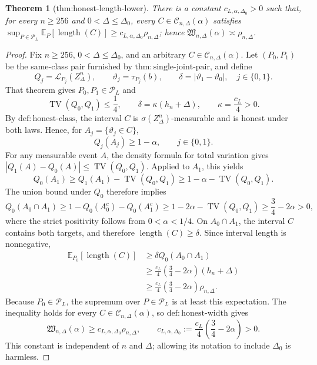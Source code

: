 \documentclass{article}
\newtheorem{theorem}{Theorem}
\begin{document}
\begin{theorem}[thm:honest-length-lower]\label{thm:honest-length-lower}
There is a constant \(c_{L,\alpha,\Delta_0}>0\) such that, for every \(n\geq256\) and \(0<\Delta\leq\Delta_0\), every \(C\in\mathcal C_{n,\Delta}(\alpha)\) satisfies \(\sup_{P\in\mathcal P_L}\mathbb E_P[\operatorname{length}(C)]\geq c_{L,\alpha,\Delta_0}\rho_{n,\Delta}\); hence \(\mathfrak W_{n,\Delta}(\alpha)\asymp\rho_{n,\Delta}\).
\end{theorem}
\begin{proof}
Fix \(n\geq256\), \(0<\Delta\leq\Delta_0\), and an arbitrary \(C\in\mathcal C_{n,\Delta}(\alpha)\).  Let \((P_0,P_1)\) be the same-class pair furnished by \(\mathrm{thm:single\text{-}joint\text{-}pair}\), and define
\[
 Q_j=\mathcal L_{P_j}(Z_\Delta^n),
 \qquad
 \vartheta_j=\tau_{P_j}(b),
 \qquad
 \delta=|\vartheta_1-\vartheta_0|,
 \quad j\in\{0,1\}.
\]
That theorem gives \(P_0,P_1\in\mathcal P_L\) and
\[
 \operatorname{TV}(Q_0,Q_1)\leq\frac14,
 \qquad
 \delta=\kappa(h_n+\Delta),
 \qquad
 \kappa=\frac{c_L}{4}>0.
\]
By \(\mathrm{def:honest\text{-}class}\), the interval \(C\) is \(\sigma(Z_\Delta^n)\)-measurable and is honest under both laws.  Hence, for \(A_j=\{\vartheta_j\in C\}\),
\[
 Q_j(A_j)\geq1-\alpha,
 \qquad j\in\{0,1\}.
\]
For any measurable event \(A\), the density formula for total variation gives \(|Q_1(A)-Q_0(A)|\leq\operatorname{TV}(Q_0,Q_1)\).  Applied to \(A_1\), this yields
\[
 Q_0(A_1)\geq Q_1(A_1)-\operatorname{TV}(Q_0,Q_1)
 \geq1-\alpha-\operatorname{TV}(Q_0,Q_1).
\]
The union bound under \(Q_0\) therefore implies
\[
 Q_0(A_0\cap A_1)
 \geq1-Q_0(A_0^c)-Q_0(A_1^c)
 \geq1-2\alpha-\operatorname{TV}(Q_0,Q_1)
 \geq\frac34-2\alpha>0,
\]
where the strict positivity follows from \(0<\alpha<1/4\).  On \(A_0\cap A_1\), the interval \(C\) contains both targets, and therefore \(\operatorname{length}(C)\geq\delta\).  Since interval length is nonnegative,
\[
 \begin{aligned}
 \mathbb E_{P_0}[\operatorname{length}(C)]
 &\geq\delta Q_0(A_0\cap A_1)\\
 &\geq\frac{c_L}{4}\left(\frac34-2\alpha\right)(h_n+\Delta)\\
 &\geq\frac{c_L}{4}\left(\frac34-2\alpha\right)\rho_{n,\Delta}.
 \end{aligned}
\]
Because \(P_0\in\mathcal P_L\), the supremum over \(P\in\mathcal P_L\) is at least this expectation.  The inequality holds for every \(C\in\mathcal C_{n,\Delta}(\alpha)\), so \(\mathrm{def:honest\text{-}width}\) gives
\[
 \mathfrak W_{n,\Delta}(\alpha)
 \geq c_{L,\alpha,\Delta_0}\rho_{n,\Delta},
 \qquad
 c_{L,\alpha,\Delta_0}:=\frac{c_L}{4}\left(\frac34-2\alpha\right)>0.
\]
This constant is independent of \(n\) and \(\Delta\); allowing its notation to include \(\Delta_0\) is harmless.


\end{proof}
\end{document}
